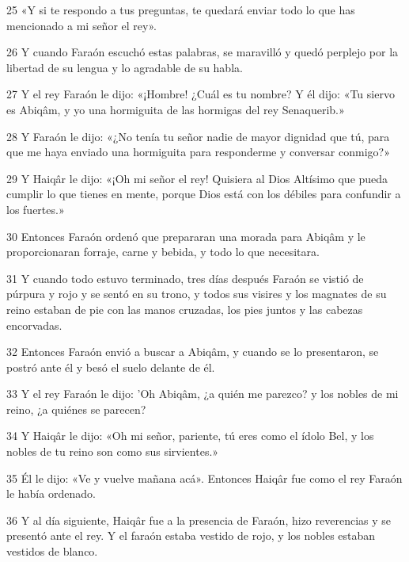 \par 25 «Y si te respondo a tus preguntas, te quedará enviar todo lo que has mencionado a mi señor el rey».

\par 26 Y cuando Faraón escuchó estas palabras, se maravilló y quedó perplejo por la libertad de su lengua y lo agradable de su habla.

\par 27 Y el rey Faraón le dijo: «¡Hombre! ¿Cuál es tu nombre? Y él dijo: «Tu siervo es Abiqâm, y yo una hormiguita de las hormigas del rey Senaquerib.»

\par 28 Y Faraón le dijo: «¿No tenía tu señor nadie de mayor dignidad que tú, para que me haya enviado una hormiguita para responderme y conversar conmigo?»

\par 29 Y Haiqâr le dijo: «¡Oh mi señor el rey! Quisiera al Dios Altísimo que pueda cumplir lo que tienes en mente, porque Dios está con los débiles para confundir a los fuertes.»

\par 30 Entonces Faraón ordenó que prepararan una morada para Abiqâm y le proporcionaran forraje, carne y bebida, y todo lo que necesitara.

\par 31 Y cuando todo estuvo terminado, tres días después Faraón se vistió de púrpura y rojo y se sentó en su trono, y todos sus visires y los magnates de su reino estaban de pie con las manos cruzadas, los pies juntos y las cabezas encorvadas.

\par 32 Entonces Faraón envió a buscar a Abiqâm, y cuando se lo presentaron, se postró ante él y besó el suelo delante de él.

\par 33 Y el rey Faraón le dijo: 'Oh Abiqâm, ¿a quién me parezco? y los nobles de mi reino, ¿a quiénes se parecen?

\par 34 Y Haiqâr le dijo: «Oh mi señor, pariente, tú eres como el ídolo Bel, y los nobles de tu reino son como sus sirvientes.»

\par 35 Él le dijo: «Ve y vuelve mañana acá». Entonces Haiqâr fue como el rey Faraón le había ordenado.

\par 36 Y al día siguiente, Haiqâr fue a la presencia de Faraón, hizo reverencias y se presentó ante el rey. Y el faraón estaba vestido de rojo, y los nobles estaban vestidos de blanco.


